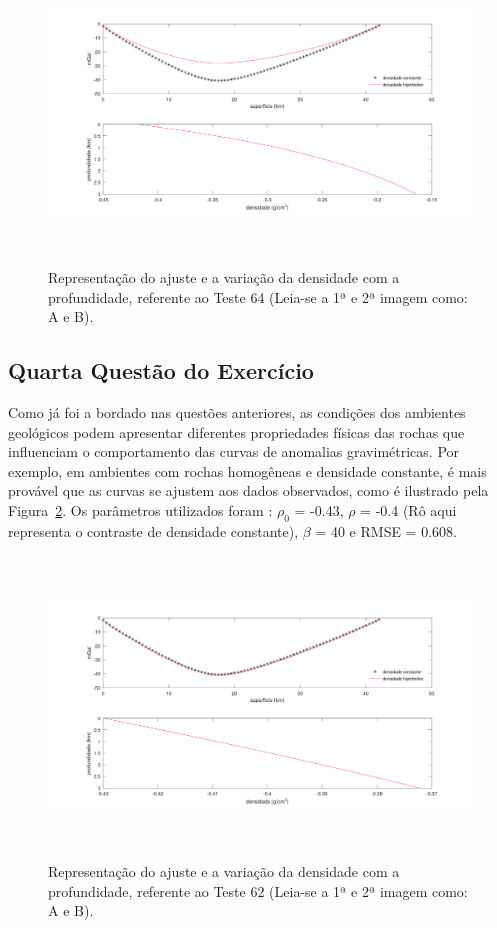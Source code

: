  \begin{figure}[!h]  
        \centering
        \includegraphics[height=8cm]{figure/Imagens 1a questao/Teste 64.png}
        \caption{Representação do ajuste e a variação da densidade com a profundidade, referente ao Teste 64 (Leia-se a 1ª e 2ª imagem como: A e B).}
        \label{Figura 6}
    \end{figure}

\vspace{6.cm}
\subsection{Quarta Questão do Exercício}

Como já foi a bordado nas questões anteriores, as condições dos ambientes geológicos podem apresentar diferentes propriedades físicas das rochas que influenciam o comportamento das curvas de anomalias gravimétricas. Por exemplo, em ambientes com rochas homogêneas e densidade constante, é mais provável que as curvas se ajustem aos dados observados, como é ilustrado pela Figura~\ref{Figura 7}. Os parâmetros utilizados foram : $\rho_0$ = -0.43, $\rho$ = -0.4 (Rô aqui representa o contraste de densidade constante), $\beta$ = 40 e RMSE = 0.608.


        \begin{figure}[!h]  
                \centering
                \includegraphics[height=8cm]{figure/Imagens 1a questao/teste62.png}
                \caption{Representação do ajuste e a variação da densidade com a profundidade, referente ao Teste 62 (Leia-se a 1ª e 2ª imagem como: A e B).}
                \label{Figura 7}
            \end{figure}


